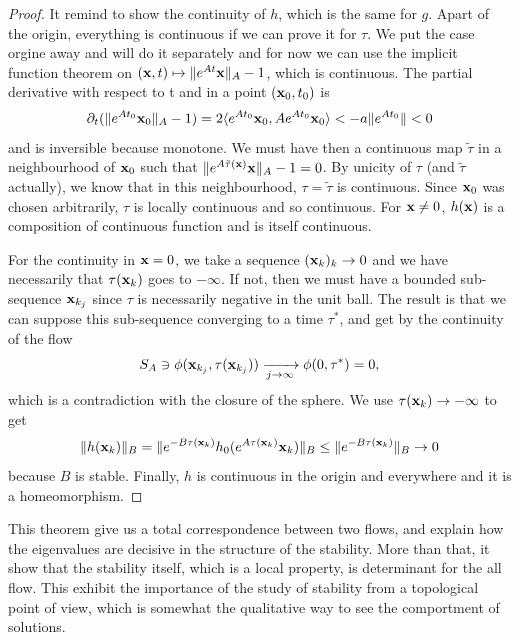 \begin{proof}
It remind to show the continuity of $h$, which is the same for $g$. Apart of the origin, everything is continuous if we can prove it for $\tau$. We put the case orgine away and will do it separately and for now we can use the implicit function theorem on $(\mathbf{x},t)\mapsto\|e^{At}\mathbf{x}\|_A-1$, which is continuous. The partial derivative with respect to t and in a point $(\mathbf{x}_0,t_0)$ is 
$$\partial_t(\|e^{At_0}\mathbf{x}_0\|_A-1)
=2\langle e^{At_0}\mathbf{x}_0,Ae^{At_0}\mathbf{x}_0\rangle
<-a\|e^{At_0}\| < 0$$
and is inversible because monotone. We must have then a continuous map $\tilde{\tau}$ in a neighbourhood of $\mathbf{x}_0$ such that $\|e^{A\tilde{\tau}(\mathbf{x})}\mathbf{x}\|_A-1=0$. By unicity of $\tau$ (and $\tilde{\tau}$ actually), we know that in this neighbourhood, $\tau=\tilde{\tau}$ is continuous. Since $\mathbf{x}_0$ was chosen arbitrarily, $\tau$ is locally continuous and so continuous. For $\mathbf{x}\neq0$, $h(\mathbf{x})$ is a composition of continuous function and is itself continuous.

For the continuity in $\mathbf{x}=0$, we take a sequence $(\mathbf{x}_k)_k\to0$  and we have necessarily that $\tau(\mathbf{x}_k)$ goes to $-\infty$. If not, then we must have a bounded sub-sequence $\mathbf{x}_{k_j}$ since $\tau$ is necessarily negative in the unit ball. The result is that we can suppose this sub-sequence converging to a time $\tau^*$, and get by the continuity of the flow
$$S_A \ni \phi(\mathbf{x}_{k_j},\tau(\mathbf{x}_{k_j}))
\xrightarrow[j\to\infty]{} \phi(0,\tau^*)=0,$$ which is a contradiction with the closure of the sphere. We use $\tau(\mathbf{x}_k)\to-\infty$ to get 
$$\|h(\mathbf{x}_k)\|_B 
= \|e^{-B\tau(\mathbf{x}_k)}h_0(e^{A\tau(\mathbf{x}_k)}\mathbf{x}_k)\|_B 
\leq \|e^{-B\tau(\mathbf{x}_k)}\|_B\to 0$$
because $B$ is stable. Finally, $h$ is continuous in the origin and everywhere and it is a homeomorphism.
\end{proof}
This theorem give us a total correspondence between two flows, and explain how the eigenvalues are decisive in the structure of the stability. More than that, it show that the stability itself, which is a local property, is determinant for the all flow. This exhibit the importance of the study of stability from a topological point of view, which is somewhat the qualitative way to see the comportment of solutions.

